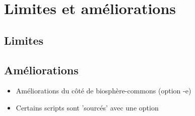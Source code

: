 \chapter{Limites et améliorations}

\section{Limites}

\section{Améliorations}

\begin{itemize}
    \item Améliorations du côté de biosphère-commons (option -e) 
    \item Certains scripts sont 'sourcés' avec une option
\end{itemize}
